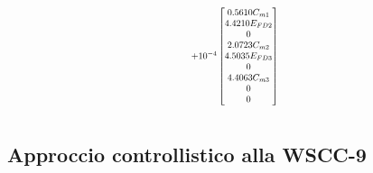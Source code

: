 \documentclass[Lau,noexaminfo]{sapthesis}
\begin{document}
	\begin{equation*}
	\resizebox{0.2\hsize}{!}{$%
	+10^{-4}\begin{bmatrix}
	0.5610C_{m1}\\
	4.4210E_{FD2}\\
	0\\
	2.0723C_{m2}\\
	4.5035E_{FD3}\\
	0\\
	4.4063C_{m3}\\
	0\\
	0
	\end{bmatrix}$%
	}%
	\end{equation*}
	\chapter{}
	\section{Approccio controllistico alla WSCC-9}
\end{document}
